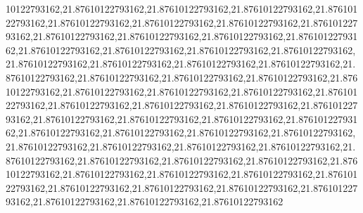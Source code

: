 10122793162,21.87610122793162,21.87610122793162,21.87610122793162,21.87610122793162,21.87610122793162,21.87610122793162,21.87610122793162,21.87610122793162,21.87610122793162,21.87610122793162,21.87610122793162,21.87610122793162,21.87610122793162,21.87610122793162,21.87610122793162,21.87610122793162,21.87610122793162,21.87610122793162,21.87610122793162,21.87610122793162,21.87610122793162,21.87610122793162,21.87610122793162,21.87610122793162,21.87610122793162,21.87610122793162,21.87610122793162,21.87610122793162,21.87610122793162,21.87610122793162,21.87610122793162,21.87610122793162,21.87610122793162,21.87610122793162,21.87610122793162,21.87610122793162,21.87610122793162,21.87610122793162,21.87610122793162,21.87610122793162,21.87610122793162,21.87610122793162,21.87610122793162,21.87610122793162,21.87610122793162,21.87610122793162,21.87610122793162,21.87610122793162,21.87610122793162,21.87610122793162,21.87610122793162,21.87610122793162,21.87610122793162,21.87610122793162,21.87610122793162,21.87610122793162,21.87610122793162,21.87610122793162,21.87610122793162,21.87610122793162,21.87610122793162
